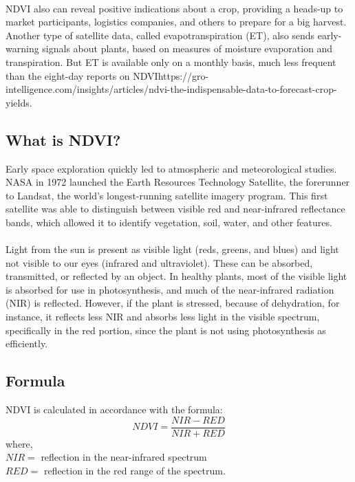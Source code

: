 \documentclass[12pt, a4paper]{report}
\begin{document}
\paragraph{}
NDVI also can reveal positive indications about a crop, providing a heads-up to market participants, logistics companies, and others to prepare for a big harvest. Another type of satellite data, called evapotranspiration (ET), also sends early-warning signals about plants, based on measures of moisture evaporation and transpiration. But ET is available only on a monthly basis, much less frequent than the eight-day reports on NDVIhttps://gro-intelligence.com/insights/articles/ndvi-the-indispensable-data-to-forecast-crop-yields.\cite{ndvione}
\subsection{What is NDVI?}
Early space exploration quickly led to atmospheric and meteorological studies. NASA in 1972 launched the Earth Resources Technology Satellite, the forerunner to Landsat, the world’s longest-running satellite imagery program. This first satellite was able to distinguish between visible red and near-infrared reflectance bands, which allowed it to identify vegetation, soil, water, and other features.\cite{ndvione}
\paragraph{}
Light from the sun is present as visible light (reds, greens, and blues) and light not visible to our eyes (infrared and ultraviolet). These can be absorbed, transmitted, or reflected by an object. In healthy plants, most of the visible light is absorbed for use in photosynthesis, and much of the near-infrared radiation (NIR) is reflected. However, if the plant is stressed, because of dehydration, for instance, it reflects less NIR and absorbs less light in the visible spectrum, specifically in the red portion, since the plant is not using photosynthesis as efficiently.\cite{ndvione}
\subsection{Formula}
NDVI is calculated in accordance with the formula:
\begin{displaymath}
NDVI=\frac{NIR-RED}{NIR+RED}
\end{displaymath}
where,\\
$NIR=$ reflection in the near-infrared spectrum\\
$RED=$ reflection in the red range of the spectrum.
\end{document}
